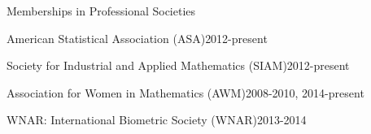 \documentclass{resume} %
\begin{document}
\clearpage
\begin{rSection}{Memberships in Professional Societies}
\begin{esSubsection}{American Statistical Association }{(ASA)}{2012-present}{}{}
\end{esSubsection}

\begin{esSubsection}{Society for Industrial and Applied Mathematics }{(SIAM)}{2012-present}{}{}
\end{esSubsection}

\begin{esSubsection}{Association for Women in Mathematics }{(AWM)}{2008-2010, 2014-present}{}{}
\end{esSubsection}

\begin{esSubsection}{WNAR: International Biometric Society }{(WNAR)}{2013-2014}{}{}
\end{esSubsection}


\end{rSection}
%
\end{document}
